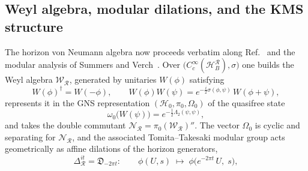 \documentclass[11pt]{article}
\begin{document}
\subsection{Weyl algebra, modular dilations, and the KMS structure}

The horizon von Neumann algebra now proceeds verbatim along Ref.~\cite{DorauMuch} and the modular analysis of Summers and Verch~\cite{SummersVerch}. Over $\big(C_c^\infty(\mathcal{H}_B^{\mathcal{R}}), \sigma\big)$ one builds the Weyl algebra $\mathscr{W}_{\mathcal{R}}$, generated by unitaries $W(\phi)$ satisfying
\begin{equation}
W(\phi)^\dagger = W(-\phi),
\qquad
W(\phi) W(\psi) = e^{-\frac{i}{2}\sigma(\phi,\psi)}\, W(\phi+\psi),
\end{equation}
represents it in the GNS representation $(\mathscr{H}_0, \pi_0, \Omega_0)$ of the quasifree state
\begin{equation}
\omega_0\big(W(\psi)\big) = e^{-\frac{1}{2}\Lambda_2(\psi,\psi)},
\end{equation}
and takes the double commutant $\mathscr{N}_{\mathcal{R}} = \pi_0(\mathscr{W}_{\mathcal{R}})''$. The vector $\Omega_0$ is cyclic and separating for $\mathscr{N}_{\mathcal{R}}$, and the associated Tomita--Takesaki modular group acts geometrically as affine dilations of the horizon generators,
\begin{equation}
\Delta_{\mathcal{R}}^{it} = \mathfrak{D}_{-2\pi t}:
\qquad
\phi(U, s) \;\longmapsto\; \phi\big(e^{-2\pi t}\, U,\; s\big),
\label{eq:dilations}
\end{equation}
\end{document}
